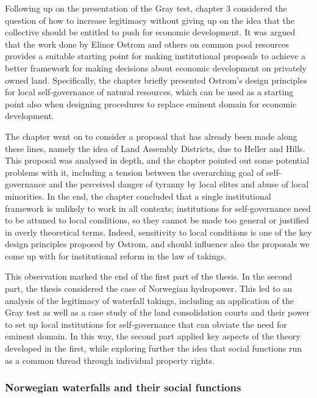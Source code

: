 Following up on the presentation of the Gray test, chapter 3 considered the question of how to increase legitimacy without giving up on the idea that the collective should be entitled to push for economic development. It was argued that the work done by Elinor Ostrom and others on common pool resources provides a suitable starting point for making institutional proposals to achieve a better framework for making decisions about economic development on privately owned land. Specifically, the chapter briefly presented Ostrom's design principles for local self-governance of natural resources, which can be used as a starting point also when designing procedures to replace eminent domain for economic development.

The chapter went on to consider a proposal that has already been made along these lines, namely the idea of Land Assembly Districts, due to Heller and Hills. This proposal was analysed in depth, and the chapter pointed out some potential problems with it, including a tension between the overarching goal of self-governance and the perceived danger of tyranny by local elites and abuse of local minorities. In the end, the chapter concluded that a single institutional framework is unlikely to work in all contexts; institutions for self-governance need to be attuned to local conditions, so they cannot be made too general or justified in overly theoretical terms. Indeed, sensitivity to local conditions is one of the key design principles proposed by Ostrom, and should influence also the proposals we come up with for institutional reform in the law of takings.

This observation marked the end of the first part of the thesis. In the second part, the thesis considered the case of Norwegian hydropower. This led to an analysis of the legitimacy of waterfall takings, including an application of the Gray test as well as a case study of the land consolidation courts and their power to set up local institutions for self-governance that can obviate the need for eminent domain. In this way, the second part applied key aspects of the theory developed in the first, while exploring further the idea that social functions run as a common thread through individual property rights.

\subsubsection*{Norwegian waterfalls and their social functions}

